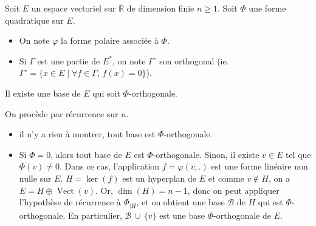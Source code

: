 




	Soit $E$ un espace vectoriel sur $\mathbb{R}$ de dimension finie $n \geq 1$. Soit $\Phi$ une forme quadratique sur $E$.

	\medskip

	\begin{notation}
		\begin{itemize}
			\item On note $\varphi$ la forme polaire associée à $\Phi$.
			\item Si $\Gamma$ est une partie de $E^*$, on note $\Gamma^\circ$ son orthogonal (ie. $\Gamma^\circ = \{ x \in E \mid \forall f \in \Gamma, \, f(x) = 0 \}$).
		\end{itemize}
	\end{notation}


	\begin{lemma}
		\label{loi-d-inertie-de-sylvester-1}
		Il existe une base de $E$ qui soit $\Phi$-orthogonale.
	\end{lemma}

	\begin{demonstration}
		On procède par récurrence sur $n$.
		\begin{itemize}
			\item {} il n'y a rien à montrer, tout base est $\Phi$-orthogonale.
			\item {} Si $\Phi = 0$, alors tout base de $E$ est $\Phi$-orthogonale. Sinon, il existe $v \in E$ tel que $\Phi(v) \neq 0$. Dans ce cas, l'application $f = \varphi(v, .)$ est une forme linéaire non nulle sur $E$.
			\newpar
			$H = \ker(f)$ est un hyperplan de $E$ et comme $v \notin H$, on a $E = H \oplus \operatorname{Vect}(v)$. Or, $\dim(H) = n-1$, donc on peut appliquer l'hypothèse de récurrence à $\Phi_{|H}$, et on obtient une base $\mathcal{B}$ de $H$ qui est $\Phi$-orthogonale. En particulier, $\mathcal{B} \, \cup \, \{ v \}$ est une base $\Phi$-orthogonale de $E$.
		\end{itemize}
	\end{demonstration}

